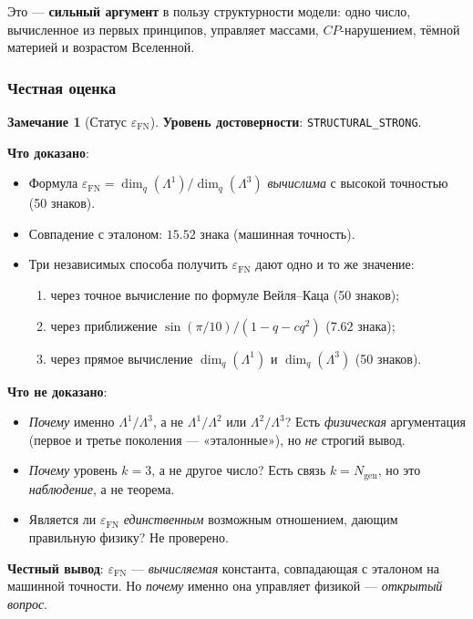 \documentclass[11pt,a4paper]{article}
\newcommand{\Ngen}{\ensuremath{N_{\text{gen}}}}
\newcommand{\epsFN}{\ensuremath{\varepsilon_{\text{FN}}}}
\theoremstyle{definition}
\newtheorem{remark}[theorem]{Замечание}
\begin{document}
Это --- \textbf{сильный аргумент} в пользу структурности модели:
одно число, вычисленное из первых принципов, управляет
массами, $CP$-нарушением, тёмной материей и возрастом Вселенной.

\subsubsection{Честная оценка}

\begin{remark}[Статус $\epsFN$]
\label{rem:eps-fn-status}
\textbf{Уровень достоверности}: \texttt{STRUCTURAL\_STRONG}.

\medskip\noindent
\textbf{Что доказано}:
\begin{itemize}
    \item Формула $\epsFN = \dim_q(\Lambda^1)/\dim_q(\Lambda^3)$
          \emph{вычислима} с высокой точностью (50 знаков).
    \item Совпадение с эталоном: $15.52$ знака (машинная точность).
    \item Три независимых способа получить $\epsFN$ дают
          одно и то же значение:
          \begin{enumerate}
              \item через точное вычисление по формуле Вейля--Каца
                    (50 знаков);
              \item через приближение $\sin(\pi/10)/(1-q-cq^2)$
                    ($7.62$ знака);
              \item через прямое вычисление $\dim_q(\Lambda^1)$
                    и $\dim_q(\Lambda^3)$ (50 знаков).
          \end{enumerate}
\end{itemize}

\medskip\noindent
\textbf{Что не доказано}:
\begin{itemize}
    \item \emph{Почему} именно $\Lambda^1/\Lambda^3$, а не
          $\Lambda^1/\Lambda^2$ или $\Lambda^2/\Lambda^3$?
          Есть \emph{физическая} аргументация (первое и третье
          поколения --- «эталонные»), но \emph{не} строгий вывод.
    \item \emph{Почему} уровень $k = 3$, а не другое число?
          Есть связь $k = \Ngen$, но это
          \emph{наблюдение}, а не теорема.
    \item Является ли $\epsFN$ \emph{единственным}
          возможным отношением, дающим правильную физику?
          Не проверено.
\end{itemize}

\medskip\noindent
\textbf{Честный вывод}: $\epsFN$ --- \emph{вычисляемая}
константа, совпадающая с эталоном на машинной точности. Но
\emph{почему} именно она управляет физикой --- \emph{открытый вопрос}.
\end{remark}
\end{document}
